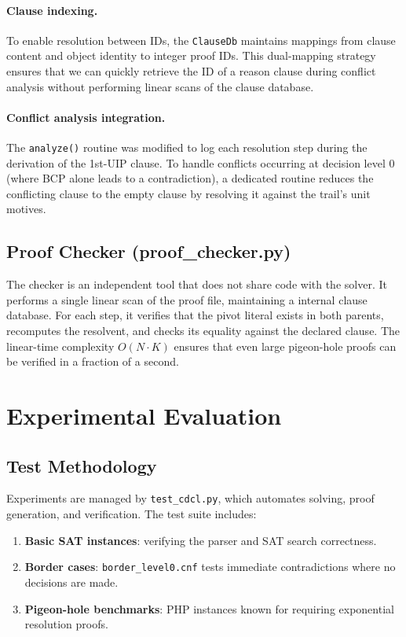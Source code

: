\documentclass{article}
\begin{document}
\paragraph{Clause indexing.}
To enable resolution between IDs, the \texttt{ClauseDb} maintains
mappings from clause content and object identity to integer proof IDs.
This dual-mapping strategy ensures that we can quickly retrieve the ID
of a reason clause during conflict analysis without performing linear
scans of the clause database.

\paragraph{Conflict analysis integration.}
The \texttt{analyze()} routine was modified to log each resolution step
during the derivation of the 1st-UIP clause.
To handle conflicts occurring at decision level 0 (where BCP alone leads
to a contradiction), a dedicated routine reduces the conflicting clause
to the empty clause by resolving it against the trail's unit motives.

\subsection{Proof Checker (proof\_checker.py)}

The checker is an independent tool that does not share code with the
solver.
It performs a single linear scan of the proof file, maintaining a
internal clause database.
For each step, it verifies that the pivot literal exists in both
parents, recomputes the resolvent, and checks its equality against the
declared clause.
The linear-time complexity $O(N \cdot K)$ ensures that even large
pigeon-hole proofs can be verified in a fraction of a second.

\section{Experimental Evaluation}

\subsection{Test Methodology}

Experiments are managed by \texttt{test\_cdcl.py}, which automates
solving, proof generation, and verification.
The test suite includes:
\begin{enumerate}
    \item \textbf{Basic SAT instances}: verifying the parser and SAT
    search correctness.
    \item \textbf{Border cases}: \texttt{border\_level0.cnf} tests
    immediate contradictions where no decisions are made.
    \item \textbf{Pigeon-hole benchmarks}: PHP instances known for
    requiring exponential resolution proofs.
\end{enumerate}
\end{document}
